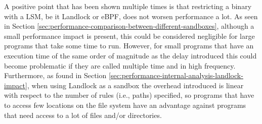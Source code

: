 A positive point that has been shown multiple times is that restricting a binary
with a LSM, be it Landlock or eBPF, does not worsen performance a lot.
As seen in Section \ref{sec:performance-comparison-between-different-sandboxes}, although a small
performance impact is present, this could be considered negligible for large programs that take
some time to run. However, for small programs that have an execution time of the same order of magnitude
as the delay introduced this could become problematic if they are called multiple time
and in high frequency.
Furthermore, as found in Section \ref{sec:performance-internal-analysis-landlock-impact}, when using Landlock
as a sandbox the overhead introduced is linear with respect to the number of rules (i.e., paths) specified,
so programs that have to access few locations on the file system have an advantage against programs that need
access to a lot of files and/or directories.